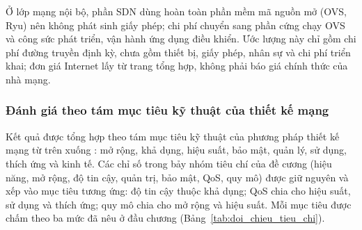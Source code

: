 Ở lớp mạng nội bộ, phần SDN dùng hoàn toàn phần mềm mã nguồn mở (OVS, Ryu) nên không phát sinh giấy phép; chi phí chuyển sang phần cứng chạy OVS và công sức phát triển, vận hành ứng dụng điều khiển. Ước lượng này chỉ gồm chi phí đường truyền định kỳ, chưa gồm thiết bị, giấy phép, nhân sự và chi phí triển khai; đơn giá Internet lấy từ trang tổng hợp, không phải báo giá chính thức của nhà mạng.

\subsubsection{Đánh giá theo tám mục tiêu kỹ thuật của thiết kế mạng}

Kết quả được tổng hợp theo tám mục tiêu kỹ thuật của phương pháp thiết kế mạng từ trên xuống \citep{oppenheimer2011topdown}: mở rộng, khả dụng, hiệu suất, bảo mật, quản lý, sử dụng, thích ứng và kinh tế. Các chỉ số trong bảy nhóm tiêu chí của đề cương (hiệu năng, mở rộng, độ tin cậy, quản trị, bảo mật, QoS, quy mô) được giữ nguyên và xếp vào mục tiêu tương ứng: độ tin cậy thuộc khả dụng; QoS chia cho hiệu suất, sử dụng và thích ứng; quy mô chia cho mở rộng và hiệu suất. Mỗi mục tiêu được chấm theo ba mức đã nêu ở đầu chương (Bảng~\ref{tab:doi_chieu_tieu_chi}).

